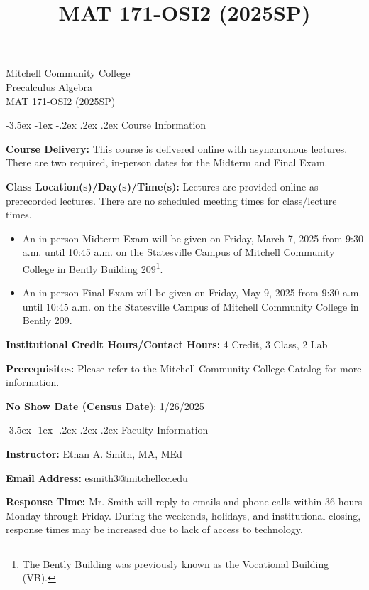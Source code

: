 \documentclass{article}
\title{MAT 171-OSI2 (2025SP)}
\makeatletter
\renewcommand\section{\@startsection{section}{1}{0pt}%
  {-3.5ex \@plus -1ex \@minus -.2ex}%
  {.2ex \@plus.2ex}%
  {\normalfont\Large\bfseries}} %
\makeatother
\begin{document}
\begin{center}
    {\huge Mitchell Community College} \\[6pt]
    {\Large Precalculus Algebra} \\[6pt]
    {\Large MAT 171-OSI2 (2025SP)}
\end{center}

\section{Course Information}

\textbf{Course Delivery:} This course is delivered online with asynchronous lectures. There are two required, in-person dates for the Midterm and Final Exam.

\textbf{Class Location(s)/Day(s)/Time(s):} Lectures are provided online as prerecorded lectures. There are no scheduled meeting times for class/lecture times.

\begin{itemize}
\item An in-person Midterm Exam will be given on Friday, March 7, 2025 from 9:30 a.m. until 10:45 a.m. on the Statesville Campus of Mitchell Community College in Bently Building 209\footnote{The Bently Building was previously known as the Vocational Building (VB).}.
\item An in-person Final Exam will be given on Friday, May 9, 2025 from 9:30 a.m. until 10:45 a.m. on the Statesville Campus of Mitchell Community College in Bently 209.
\end{itemize}

\textbf{Institutional Credit Hours/Contact Hours:} 4 Credit, 3 Class, 2 Lab

\textbf{Prerequisites:} Please refer to the Mitchell Community College Catalog for more information.

\textbf{No Show Date (Census Date}): 1/26/2025

\section{Faculty Information}

\textbf{Instructor:} Ethan A. Smith, MA, MEd

\textbf{Email Address:} \href{mailto:esmith3@mitchellcc.edu}{esmith3@mitchellcc.edu}

\textbf{Response Time:} Mr. Smith will reply to emails and phone calls within 36 hours Monday through Friday. During the weekends, holidays, and institutional closing, response times may be increased due to lack of access to technology.
\end{document}
